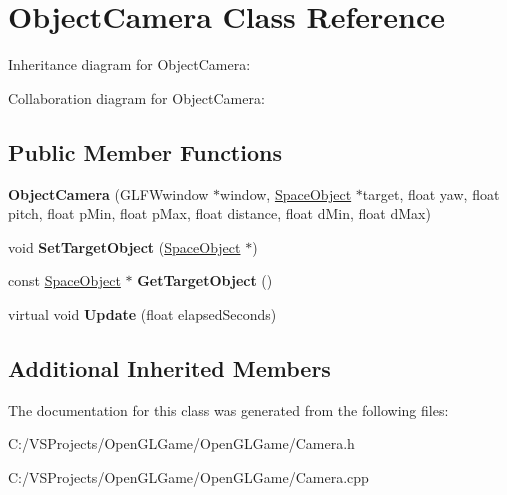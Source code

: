 \hypertarget{class_object_camera}{\section{Object\-Camera Class Reference}
\label{class_object_camera}
}


Inheritance diagram for Object\-Camera\-:


Collaboration diagram for Object\-Camera\-:
\subsection*{Public Member Functions}
\begin{DoxyCompactItemize}
\item 
\hypertarget{class_object_camera_a83b5052790edba9a788feb5da244378f}{{\bfseries Object\-Camera} (G\-L\-F\-Wwindow $\ast$window, \hyperlink{class_space_object}{Space\-Object} $\ast$target, float yaw, float pitch, float p\-Min, float p\-Max, float distance, float d\-Min, float d\-Max)}\label{class_object_camera_a83b5052790edba9a788feb5da244378f}

\item 
\hypertarget{class_object_camera_a3df3185eef764dd944f912e863b34dc1}{void {\bfseries Set\-Target\-Object} (\hyperlink{class_space_object}{Space\-Object} $\ast$)}\label{class_object_camera_a3df3185eef764dd944f912e863b34dc1}

\item 
\hypertarget{class_object_camera_a8330594d464693255e7df3185c025a3c}{const \hyperlink{class_space_object}{Space\-Object} $\ast$ {\bfseries Get\-Target\-Object} ()}\label{class_object_camera_a8330594d464693255e7df3185c025a3c}

\item 
\hypertarget{class_object_camera_a5a99a5560d287380ac4691351239fe44}{virtual void {\bfseries Update} (float elapsed\-Seconds)}\label{class_object_camera_a5a99a5560d287380ac4691351239fe44}

\end{DoxyCompactItemize}
\subsection*{Additional Inherited Members}


The documentation for this class was generated from the following files\-:\begin{DoxyCompactItemize}
\item 
C\-:/\-V\-S\-Projects/\-Open\-G\-L\-Game/\-Open\-G\-L\-Game/Camera.\-h\item 
C\-:/\-V\-S\-Projects/\-Open\-G\-L\-Game/\-Open\-G\-L\-Game/Camera.\-cpp\end{DoxyCompactItemize}
